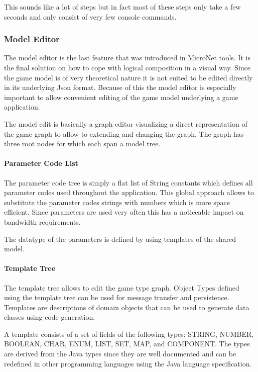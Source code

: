 This sounds like a lot of steps but in fact most of these steps only take a few
seconds and only consist of very few console commands.

\subsubsection{Model Editor}

The model editor is the last feature that was introduced in MicroNet tools. It
is the final solution on how to cope with logical \ms{} composition in a visual
way. Since the game model is of very theoretical nature it is not suited to be
edited directly in its underlying Json format. Because of this the model editor
is especially important to allow convenient editing of the game model underlying
a game application.

The model edit is basically a graph editor visualizing a direct representation
of the game graph to allow to extending and changing the graph. The graph has
three root nodes for which each span a model tree.

\paragraph{Parameter Code List}

The parameter code tree is simply a flat list of String constants which defines
all parameter codes used throughout the application. This global approach allows
to substitute the parameter codes strings with numbers which is more space
efficient. Since parameters are used very often this has a noticeable impact on
bandwidth requirements.

The datatype of the parameters is defined by using templates of the shared
model.

\paragraph{Template Tree}

The template tree allows to edit the game type graph. Object Types defined using
the template tree can be used for message transfer and persistence. Templates
are descriptions of domain objects that can be used to generate data classes
using code generation.

A template consists of a set of fields of the following types: STRING, NUMBER,
BOOLEAN, CHAR, ENUM, LIST, SET, MAP, and COMPONENT. The types are derived from
the Java types since they are well documented and can be redefined in other
programming languages using the Java language specification.


